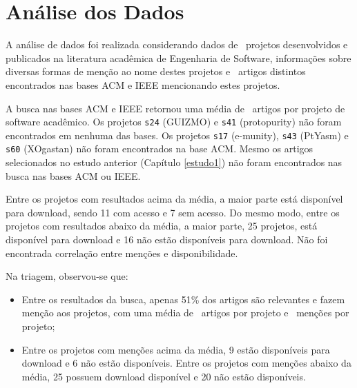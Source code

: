%







\section{Análise dos Dados} \label{estudo2:analise} %

A análise de dados foi realizada considerando
dados de \SoftwareCount \ projetos desenvolvidos e publicados na literatura
acadêmica de Engenharia de Software, informações sobre diversas formas de
menção ao nome destes projetos e \ScreeningUniqueCount \ artigos distintos
encontrados nas bases ACM e IEEE mencionando estes projetos.

A busca nas bases ACM e IEEE retornou uma média de \SearchUniqueMean \ artigos
por projeto de software acadêmico. 
Os projetos \texttt{s24} (GUIZMO) e \texttt{s41} (protopurity)
não foram encontrados em nenhuma das bases.
Os projetos \texttt{s17} (e-munity), \texttt{s43} (PtYasm) e \texttt{s60} (XOgastan)
não foram encontrados na base ACM.
Mesmo os artigos selecionados no estudo anterior (Capítulo \ref{estudo1}) não
foram encontrados nas busca nas bases ACM ou IEEE.

Entre os projetos com resultados acima da média, 
a maior parte está disponível para download, 
sendo 11 com acesso e 7 sem acesso.  
Do mesmo modo, entre os projetos com resultados abaixo da média, 
a maior parte, 25 projetos, está disponível para download
e 16 não estão disponíveis para download.
Não foi encontrada correlação entre menções e disponibilidade.

Na triagem, observou-se que:

\begin{itemize}
  \item Entre os resultados da busca, apenas 51\% dos artigos são relevantes e
    fazem menção aos projetos, com uma média de \ScreeningUniqueMean \ artigos
    por projeto e \ScreeningMean \ menções por projeto;
  \item Entre os projetos com menções acima da média, 9 estão disponíveis para
    download e 6 não estão disponíveis. Entre os projetos com menções abaixo da
    média, 25 possuem download disponível e 20 não estão disponíveis.
\end{itemize}

